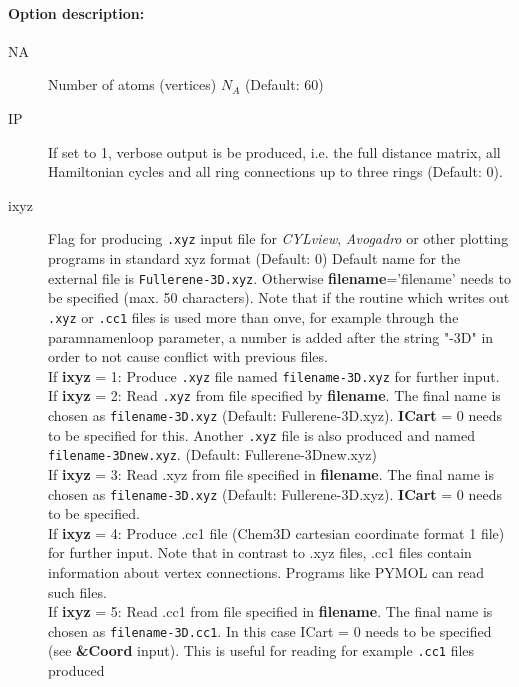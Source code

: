 \documentclass[article,a4paper,twoside]{memoir}
\newcommand{\program}[1]{\textit{#1}}
\newcommand{\filename}[1]{\texttt{#1}}
\newcommand{\paramname}[1]{{\color{green}\textbf{#1}}}
\begin{document}
\paragraph{Option description:}
\begin{description}
\item[{NA}]   Number of atoms (vertices) $N_A$ (Default: 60)
\item[{IP}]  If set to 1, verbose output is be produced, i.e. the full distance matrix, all Hamiltonian cycles 
  and all ring connections up to three rings (Default: 0).
\item[{ixyz}] Flag for producing \filename{.xyz} input file for \program{CYLview}, \program{Avogadro} or other plotting programs in standard xyz format (Default: 0)
  Default name for the external file is \filename{Fullerene-3D.xyz}. Otherwise \paramname{filename}='filename' needs to be specified (max. 50 characters).
  Note that if the routine which writes out \filename{.xyz} or \filename{.cc1} files is used more than onve, for example through the paramname{nloop} parameter,
  a number is added after the string "-3D" in order to not cause conflict with previous files.\\
  If \paramname{ixyz} = 1: Produce \filename{.xyz} file named \filename{filename-3D.xyz} for further input.\\
  If \paramname{ixyz} = 2: Read \filename{.xyz} from file specified by \paramname{filename}. The final name is chosen as \filename{filename-3D.xyz} (Default: Fullerene-3D.xyz). 
  \paramname{ICart} = 0 needs to be specified for this. Another \filename{.xyz} file is also produced and named   \filename{filename-3Dnew.xyz}. (Default: Fullerene-3Dnew.xyz)\\
  If \paramname{ixyz} = 3: Read .xyz from file specified in \paramname{filename}. The final name is chosen as \filename{filename-3D.xyz} (Default: Fullerene-3D.xyz). 
  \paramname{ICart} = 0  needs to be specified.\\
  If \paramname{ixyz} = 4: Produce .cc1 file (Chem3D cartesian coordinate format 1 file) for further input. Note that in contrast to .xyz files,
  .cc1 files contain information about vertex connections. Programs like PYMOL can read such files.\\
  If \paramname{ixyz} = 5: Read .cc1 from file specified in \paramname{filename}. The final name is chosen as \filename{filename-3D.cc1}. 
  In this case ICart = 0  needs to be specified (see \paramname{\&Coord} input). This is useful for reading for example \filename{.cc1} files produced 

\end{description}
\end{document}
